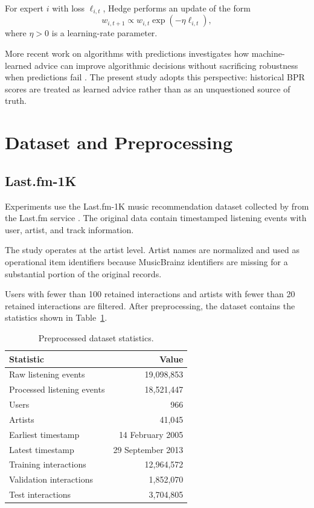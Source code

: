 \documentclass[11pt]{article}
\begin{document}
For expert $i$ with loss $\ell_{i,t}$, Hedge performs an update of the
form
%
\begin{equation}
    w_{i,t+1}
    \propto
    w_{i,t}
    \exp(-\eta \ell_{i,t}),
\end{equation}
%
where $\eta>0$ is a learning-rate parameter.

More recent work on algorithms with predictions investigates how
machine-learned advice can improve algorithmic decisions without
sacrificing robustness when predictions fail
\citep{lykouris2018competitive,mitzenmacher2022algorithms}.
The present study adopts this perspective: historical BPR scores are
treated as learned advice rather than as an unquestioned source of
truth.


\section{Dataset and Preprocessing}

\subsection{Last.fm-1K}

Experiments use the Last.fm-1K music recommendation dataset collected
by \citet{celma2010lastfm} from the Last.fm service
\citep{lastfm}. The original data contain timestamped listening events
with user, artist, and track information.

The study operates at the artist level. Artist names are normalized and
used as operational item identifiers because MusicBrainz identifiers
are missing for a substantial portion of the original records.

Users with fewer than 100 retained interactions and artists with fewer
than 20 retained interactions are filtered. After preprocessing, the
dataset contains the statistics shown in Table~\ref{tab:dataset}.

\begin{table}[H]
\centering
\caption{Preprocessed dataset statistics.}
\label{tab:dataset}
\begin{tabular}{lr}
\toprule
Statistic & Value \\
\midrule
Raw listening events & 19,098,853 \\
Processed listening events & 18,521,447 \\
Users & 966 \\
Artists & 41,045 \\
Earliest timestamp & 14 February 2005 \\
Latest timestamp & 29 September 2013 \\
Training interactions & 12,964,572 \\
Validation interactions & 1,852,070 \\
Test interactions & 3,704,805 \\
\bottomrule
\end{tabular}
\end{table}
\end{document}
